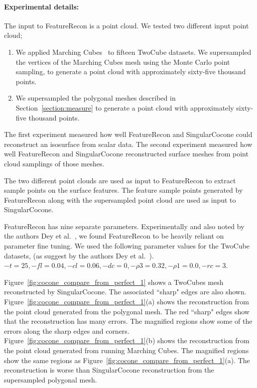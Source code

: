 \paragraph{Experimental details:} 

The input to FeatureRecon is a point cloud. 
We tested two different input point cloud;
\begin{enumerate}
\item We applied Marching Cubes~\cite{lc-mchr3-87} 
to fifteen TwoCube datasets. 
We supersampled the vertices of the Marching Cubes mesh
using the Monte Carlo point sampling,
to generate a point cloud with approximately sixty-five thousand points.

\item We supersampled the polygonal meshes described 
in Section~\ref{section:measure}
to generate a point cloud with approximately sixty-five thousand points.
\end{enumerate}

The first experiment measured how well FeatureRecon and SingularCocone
could reconstruct an isosurface from scalar data.
The second experiment measured how well FeatureRecon and SingularCocone
reconstructed surface meshes from point cloud samplings of those meshes.

The two different point clouds are used as input to FeatureRecon to
extract sample points on the surface features.  
The feature sample points generated by FeatureRecon along with the
supersampled point cloud are used as input to SingularCocone.

FeatureRecon has nine separate
parameters. Experimentally and also noted by the authors Dey et
al.~\cite{Dey2013}, we found FeatureRecon to be heavily reliant on
parameter fine tuning. We used the following parameter values for the
TwoCube datasets, (as suggest by the authors Dey et
al.~\cite{Dey2013}).  $-t = 25,-fl = 0.04, -cl = 0.06, -dc = 0, -\rho3
= 0.32, -\rho1 = 0.0, -rc = 3$.

Figure~\ref{fig:cocone_compare_from_perfect_1} shows 
a TwoCubes mesh reconstructed by SingularCocone.
The associated ``sharp" edges are
also shown. Figure~\ref{fig:cocone_compare_from_perfect_1}(a) shows
the reconstruction from the point cloud generated from the polygonal
mesh. The red ``sharp" edges show that the
reconstruction has many errors. The magnified regions show some of the
errors along the sharp edges and
corners. Figure~\ref{fig:cocone_compare_from_perfect_1}(b) shows the
reconstruction from the point cloud generated from running Marching
Cubes. The magnified regions show the same regions as
Figure~\ref{fig:cocone_compare_from_perfect_1}(a). The reconstruction
is worse than SingularCocone reconstruction 
from the supersampled polygonal mesh.

